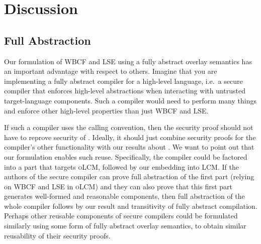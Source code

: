 \documentclass[acmsmall,screen]{acmart}\settopmatter{}
\newcommand{\trgcm}{\textsc{LCM}}
\newcommand{\srccm}{\textsc{oLCM}}
\begin{document}


\section{Discussion}
\label{sec:discussion}
\subsection{Full Abstraction}
Our formulation of WBCF and LSE using a fully abstract overlay semantics has an important advantage with respect to others.
Imagine that you are implementing a fully abstract compiler for a high-level language, i.e.\ a secure compiler that enforces high-level abstractions when interacting with untrusted target-language components.
Such a compiler would need to perform many things and enforce other high-level properties than just WBCF and LSE.

If such a compiler uses the \stktokens{} calling convention, then the security proof should not have to reprove security of \stktokens{}.
Ideally, it should just combine security proofs for the compiler's other functionality with our results about \stktokens{}.
We want to point out that our formulation enables such reuse.
Specifically, the compiler could be factored into a part that targets \srccm{}, followed by our embedding into \trgcm{}.
If the authors of the secure compiler can prove full abstraction of the first part (relying on WBCF and LSE in \srccm{}) and they can also prove that this first part generates well-formed and reasonable components, then full abstraction of the whole compiler follows by our result and transitivity of fully abstract compilation.
Perhaps other reusable components of secure compilers could be formulated similarly using some form of fully abstract overlay semantics, to obtain similar reusability of their security proofs.
\end{document}

